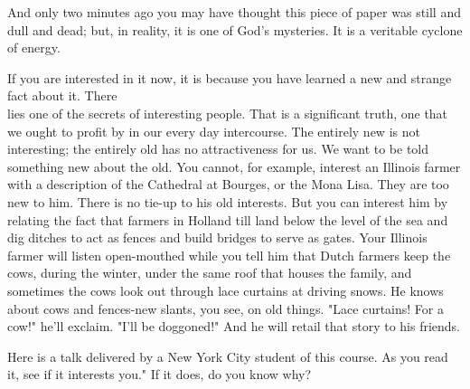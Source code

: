 \documentclass[10pt]{article}
\begin{document}
And only two minutes ago you may have thought this piece of paper was still and dull and dead; but, in reality, it is one of God's mysteries. It is a veritable cyclone of energy.

If you are interested in it now, it is because you have learned a new and strange fact about it. There\\
lies one of the secrets of interesting people. That is a significant truth, one that we ought to profit by in our every day intercourse. The entirely new is not interesting; the entirely old has no attractiveness for us. We want to be told something new about the old. You cannot, for example, interest an Illinois farmer with a description of the Cathedral at Bourges, or the Mona Lisa. They are too new to him. There is no tie-up to his old interests. But you can interest him by relating the fact that farmers in Holland till land below the level of the sea and dig ditches to act as fences and build bridges to serve as gates. Your Illinois farmer will listen open-mouthed while you tell him that Dutch farmers keep the cows, during the winter, under the same roof that houses the family, and sometimes the cows look out through lace curtains at driving snows. He knows about cows and fences-new slants, you see, on old things. "Lace curtains! For a cow!" he'll exclaim. "I'll be doggoned!" And he will retail that story to his friends.

Here is a talk delivered by a New York City student of this course. As you read it, see if it interests you." If it does, do you know why?
\end{document}
